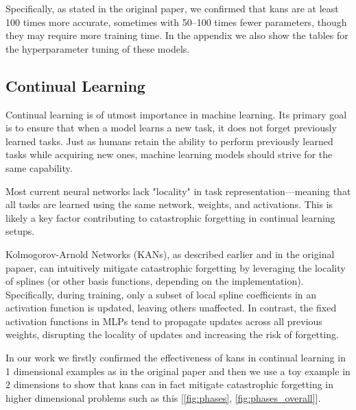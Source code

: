 \documentclass[conference]{IEEEtran}
\begin{document}
Specifically, as stated in the original paper, we confirmed that kans are at
least 100 times more accurate, sometimes with 50--100 times fewer parameters,
though they may require more training time. In the appendix we also show the
tables for the hyperparameter tuning of these models.

\subsection{Continual Learning}
Continual learning is of utmost importance in machine learning. Its primary
goal is to ensure that when a model learns a new task, it does not forget
previously learned tasks. Just as humans retain the ability to perform
previously learned tasks while acquiring new ones, machine learning models
should strive for the same capability.

Most current neural networks lack "locality" in task representation—meaning
that all tasks are learned using the same network, weights, and activations.
This is likely a key factor contributing to catastrophic forgetting in
continual learning setups.

Kolmogorov-Arnold Networks (KANs), as described earlier and in the original
papaer, can intuitively mitigate catastrophic forgetting by leveraging the
locality of splines (or other basis functions, depending on the
implementation). Specifically, during training, only a subset of local spline
coefficients in an activation function is updated, leaving others unaffected.
In contrast, the fixed activation functions in MLPs tend to propagate updates
across all previous weights, disrupting the locality of updates and increasing
the risk of forgetting.

In our work we firstly confirmed the effectiveness of kans in continual
learning in 1 dimensional examples as in the original paper and then we use a
toy example in 2 dimensions to show that kans can in fact mitigate catastrophic
forgetting in higher dimensional problems such as this [\ref{fig:phases},
        \ref{fig:phases_overall}].
\end{document}
